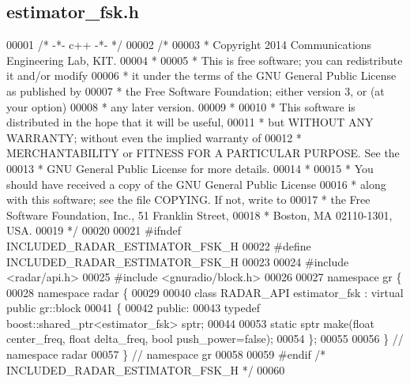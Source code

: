 \subsection{estimator\+\_\+fsk.\+h}
\label{estimator__fsk_8h_source}

\begin{DoxyCode}
00001 \textcolor{comment}{/* -*- c++ -*- */}
00002 \textcolor{comment}{/* }
00003 \textcolor{comment}{ * Copyright 2014 Communications Engineering Lab, KIT.}
00004 \textcolor{comment}{ * }
00005 \textcolor{comment}{ * This is free software; you can redistribute it and/or modify}
00006 \textcolor{comment}{ * it under the terms of the GNU General Public License as published by}
00007 \textcolor{comment}{ * the Free Software Foundation; either version 3, or (at your option)}
00008 \textcolor{comment}{ * any later version.}
00009 \textcolor{comment}{ * }
00010 \textcolor{comment}{ * This software is distributed in the hope that it will be useful,}
00011 \textcolor{comment}{ * but WITHOUT ANY WARRANTY; without even the implied warranty of}
00012 \textcolor{comment}{ * MERCHANTABILITY or FITNESS FOR A PARTICULAR PURPOSE.  See the}
00013 \textcolor{comment}{ * GNU General Public License for more details.}
00014 \textcolor{comment}{ * }
00015 \textcolor{comment}{ * You should have received a copy of the GNU General Public License}
00016 \textcolor{comment}{ * along with this software; see the file COPYING.  If not, write to}
00017 \textcolor{comment}{ * the Free Software Foundation, Inc., 51 Franklin Street,}
00018 \textcolor{comment}{ * Boston, MA 02110-1301, USA.}
00019 \textcolor{comment}{ */}
00020 
00021 \textcolor{preprocessor}{#ifndef INCLUDED\_RADAR\_ESTIMATOR\_FSK\_H}
00022 \textcolor{preprocessor}{#define INCLUDED\_RADAR\_ESTIMATOR\_FSK\_H}
00023 
00024 \textcolor{preprocessor}{#include <radar/api.h>}
00025 \textcolor{preprocessor}{#include <gnuradio/block.h>}
00026 
00027 \textcolor{keyword}{namespace }gr \{
00028   \textcolor{keyword}{namespace }radar \{
00029 
00040     \textcolor{keyword}{class }RADAR_API estimator_fsk : \textcolor{keyword}{virtual} \textcolor{keyword}{public} gr::block
00041     \{
00042      \textcolor{keyword}{public}:
00043       \textcolor{keyword}{typedef} boost::shared\_ptr<estimator\_fsk> sptr;
00044 
00053       \textcolor{keyword}{static} sptr make(\textcolor{keywordtype}{float} center_freq, \textcolor{keywordtype}{float} delta\_freq, \textcolor{keywordtype}{bool} push\_power=\textcolor{keyword}{false});
00054     \};
00055 
00056   \} \textcolor{comment}{// namespace radar}
00057 \} \textcolor{comment}{// namespace gr}
00058 
00059 \textcolor{preprocessor}{#endif }\textcolor{comment}{/* INCLUDED\_RADAR\_ESTIMATOR\_FSK\_H */}\textcolor{preprocessor}{}
00060 
\end{DoxyCode}
